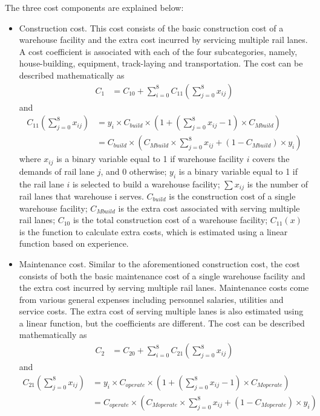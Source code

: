 The three cost components are explained below:
\begin{itemize}
	\item Construction cost. This cost consists of the basic construction cost of a warehouse facility and the extra cost incurred by servicing multiple rail lanes. 
	A cost coefficient is associated with each of the four subcategories, namely, house-building, equipment, track-laying and transportation. 
	The cost can be described mathematically as
	\begin{align}
		C_1 &= C_{10} + \sum_{i = 0}^{8}C_{11}(\sum_{j = 0}^{8}x_{ij})
	\end{align}
	and
	\begin{align}
		C_{11}(\sum_{j = 0}^{8}x_{ij}) &= y_i \times C_{build} \times (1 + (\sum_{j = 0}^{8}x_{ij} - 1) \times C_{Mbuild}) \\
		&= C_{build} \times (C_{Mbuild} \times \sum_{j = 0}^8 x_{ij} + (1 - C_{Mbuild})\times y_i)
	\end{align}
	where $x_{ij}$ is a binary variable equal to 1 if warehouse facility $i$ covers the demands of rail lane $j$, and 0 otherwise;
	$y_i$ is a binary variable equal to 1 if the rail lane $i$ is selected to build a warehouse facility;
	$\sum x_{ij}$ is the number of rail lanes that warehouse i serves.
	$C_{build}$ is the construction cost of a single warehouse facility;
	$C_{Mbuild}$ is the extra cost associated with serving multiple rail lanes;
	$C_{10}$ is the total construction cost of a warehouse facility;
	$C_{11}(x)$ is the function to calculate extra costs, which is estimated using a linear function based on experience.
	\item Maintenance cost. Similar to the aforementioned construction cost, the  cost consists of both the basic maintenance cost of a single warehouse facility and the extra cost incurred by serving multiple rail lanes.
	Maintenance costs come from various general expenses including personnel salaries, utilities and service costs.
	The extra cost of serving multiple lanes is also estimated using a linear function, but the coefficients are different.
	The cost can be described mathematically as
	\begin{align}
		C_2 &= C_{20} + \sum_{i = 0}^{8}C_{21}(\sum_{j = 0}^{8}x_{ij})
	\end{align}
	and
	\begin{align}
		C_{21}(\sum_{j = 0}^{8}x_{ij}) &= y_i \times C_{operate} \times (1 + (\sum_{j = 0}^8 x_{ij} - 1) \times C_{Moperate}) \\
		&= C_{operate} \times (C_{Moperate} \times \sum_{j = 0}^8 x_{ij} + (1 - C_{Moperate}) \times y_i)

\end{align}
\end{itemize}
